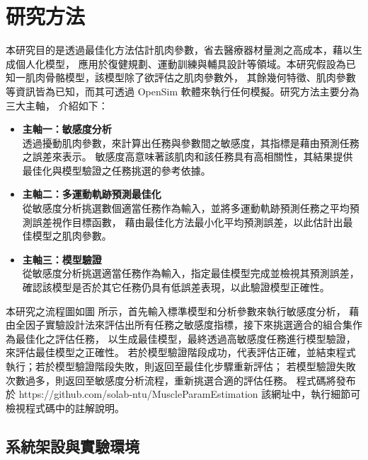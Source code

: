 \chapter{研究方法}
\fontsize{12pt}{18pt}\selectfont

本研究目的是透過最佳化方法估計肌肉參數，省去醫療器材量測之高成本，藉以生成個人化模型，
應用於復健規劃、運動訓練與輔具設計等領域。本研究假設為已知一肌肉骨骼模型，該模型除了欲評估之肌肉參數外，
其餘幾何特徵、肌肉參數等資訊皆為已知，而其可透過 OpenSim 軟體來執行任何模擬。研究方法主要分為三大主軸，
介紹如下：
\begin{itemize}
    \item \textbf{主軸一：敏感度分析}
    \\ 透過擾動肌肉參數，來計算出任務與參數間之敏感度，其指標是藉由預測任務之誤差來表示。
       敏感度高意味著該肌肉和該任務具有高相關性，其結果提供最佳化與模型驗證之任務挑選的參考依據。
    \item \textbf{主軸二：多運動軌跡預測最佳化}
    \\ 從敏感度分析挑選數個適當任務作為輸入，並將多運動軌跡預測任務之平均預測誤差視作目標函數，
       藉由最佳化方法最小化平均預測誤差，以此估計出最佳模型之肌肉參數。   
    \item \textbf{主軸三：模型驗證}
    \\ 從敏感度分析挑選適當任務作為輸入，指定最佳模型完成並檢視其預測誤差，
       確認該模型是否於其它任務仍具有低誤差表現，以此驗證模型正確性。
\end{itemize}

本研究之流程圖如圖 所示，首先輸入標準模型和分析參數來執行敏感度分析，
藉由全因子實驗設計法來評估出所有任務之敏感度指標，接下來挑選適合的組合集作為最佳化之評估任務，
以生成最佳模型，最終透過高敏感度任務進行模型驗證，來評估最佳模型之正確性。
若於模型驗證階段成功，代表評估正確，並結束程式執行；若於模型驗證階段失敗，則返回至最佳化步驟重新評估；
若模型驗證失敗次數過多，則返回至敏感度分析流程，重新挑選合適的評估任務。
程式碼將發布於 https://github.com/solab-ntu/MuscleParamEstimation 該網址中，執行細節可檢視程式碼中的註解說明。

\clearpage

\section{系統架設與實驗環境}

